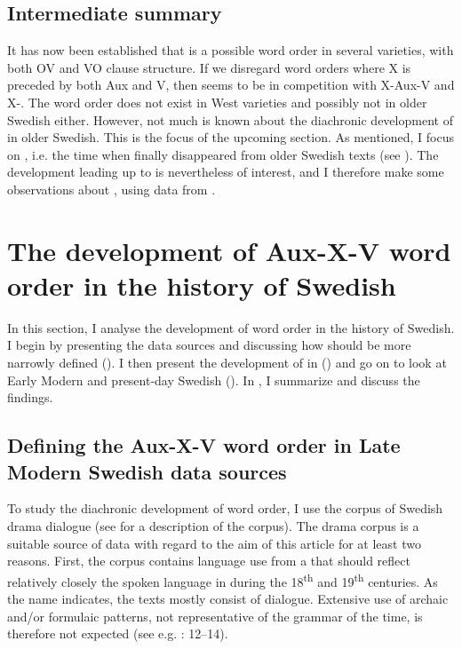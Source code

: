 \documentclass[output=paper, colorlinks, citecolor=brown]{langscibook}
\begin{document}
\subsection{Intermediate summary}\label{sec:sangfelt:3.4}

It has now been established that  is a possible word order in several  varieties, with both OV and VO clause structure. If we disregard word orders where X is preceded by both Aux and V, then  seems to be in competition with X-Aux-V and X-. The word order  does not exist in West  varieties and possibly not in older Swedish either. However, not much is known about the diachronic development of  in older Swedish. This is the focus of the upcoming section. As mentioned, I focus on , i.e. the time when  finally disappeared from older Swedish texts (see \citealt{Platzack1983,Petzell2011,Sangfelt2019}). The development leading up to  is nevertheless of interest, and I therefore make some observations about , using data from \citet{Sangfelt2019}.

\section{The development of Aux-X-V word order in the history of Swedish}\label{sec:sangfelt:4}

In this section, I analyse the development of  word order in the history of Swedish. I begin by presenting the data sources and discussing how  should be more narrowly defined (). I then present the development of  in  () and go on to look at Early Modern and present-day Swedish (). In , I summarize and discuss the findings.

\subsection{Defining the Aux-X-V word order in Late Modern Swedish data sources}\label{sec:sangfelt:4.1}

To study the diachronic development of  word order, I use the corpus of Swedish drama dialogue (see \citealt{MarttalaStromquist2001} for a description of the corpus). The drama corpus is a suitable source of data with regard to the aim of this article for at least two reasons. First, the corpus contains language use from a  that should reflect relatively closely the spoken language in  during the 18\textsuperscript{th} and 19\textsuperscript{th} centuries. As the name indicates, the texts mostly consist of dialogue. Extensive use of archaic and/or formulaic patterns, not representative of the grammar of the time, is therefore not expected (see e.g. \citealt{Fischer2007}: 12–14).
\end{document}
